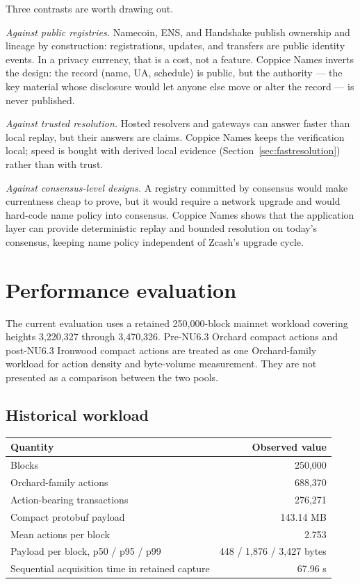 \documentclass[11pt]{article}
\begin{document}
Three contrasts are worth drawing out.

\emph{Against public registries.} Namecoin, ENS, and Handshake publish
ownership and lineage by construction: registrations, updates, and transfers
are public identity events. In a privacy currency, that is a cost, not a
feature. Coppice Names inverts the design: the record (name, UA, schedule) is
public, but the authority --- the key material whose disclosure would let
anyone else move or alter the record --- is never published.

\emph{Against trusted resolution.} Hosted resolvers and gateways can answer
faster than local replay, but their answers are claims. Coppice Names keeps
the verification local; speed is bought with derived local evidence
(Section~\ref{sec:fastresolution}) rather than with trust.

\emph{Against consensus-level designs.} A registry committed by consensus
would make currentness cheap to prove, but it would require a network upgrade
and would hard-code name policy into consensus. Coppice Names shows that the
application layer can provide deterministic replay and bounded resolution on
today's consensus, keeping name policy independent of Zcash's upgrade cycle.

\section{Performance evaluation}
\label{sec:performance}

The current evaluation uses a retained 250,000-block mainnet workload
covering heights 3,220,327 through 3,470,326. Pre-NU6.3 Orchard compact
actions and post-NU6.3 Ironwood compact actions are treated as one
Orchard-family workload for action density and byte-volume measurement. They
are not presented as a comparison between the two pools.

\subsection{Historical workload}

\begin{center}
\small
\begin{tabular}{>{\raggedright\arraybackslash}p{}r}
\toprule
Quantity & Observed value \\
\midrule
Blocks & 250,000 \\
Orchard-family actions & 688,370 \\
Action-bearing transactions & 276,271 \\
Compact protobuf payload & 143.14 MB \\
Mean actions per block & 2.753 \\
Payload per block, p50 / p95 / p99 & 448 / 1,876 / 3,427 bytes \\
Sequential acquisition time in retained capture & 67.96 s \\
\bottomrule
\end{tabular}
\end{center}
\end{document}

